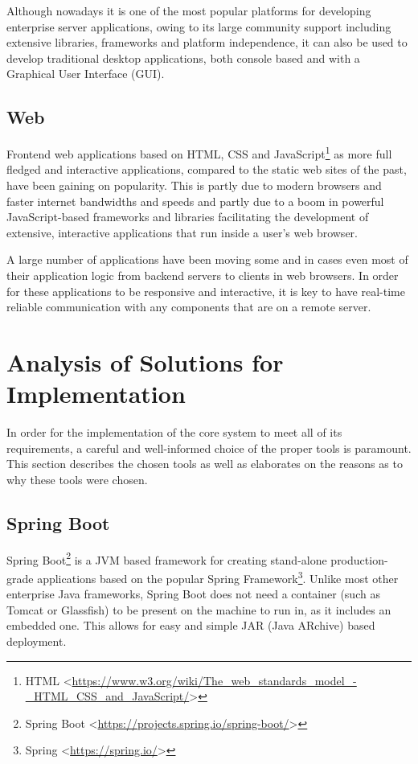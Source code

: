 Although nowadays it is one of the most popular platforms for developing enterprise server applications, owing to its large community support including extensive libraries, frameworks and platform independence, it can also be used to develop traditional desktop applications, both console based and with a Graphical User Interface (GUI).

\subsection{Web}
Frontend web applications based on HTML, CSS and JavaScript\footnote{HTML <\url{https://www.w3.org/wiki/The_web_standards_model_-_HTML_CSS_and_JavaScript/}>} as more full fledged and interactive applications, compared to the static web sites of the past, have been gaining on popularity. This is partly due to modern browsers and faster internet bandwidths and speeds and partly due to a boom in powerful JavaScript-based frameworks and libraries facilitating the development of extensive, interactive applications that run inside a user's web browser.

A large number of applications have been moving some and in cases even most of their application logic from backend servers to clients in web browsers. In order for these applications to be responsive and interactive, it is key to have real-time reliable communication with any components that are on a remote server.

\section{Analysis of Solutions for Implementation}
In order for the implementation of the core system to meet all of its requirements, a careful and well-informed choice of the proper tools is paramount. This section describes the chosen tools as well as elaborates on the reasons as to why these tools were chosen.
\subsection{Spring Boot}
Spring Boot\footnote{Spring Boot <\url{https://projects.spring.io/spring-boot/}>} is a JVM based framework for creating stand-alone production-grade applications based on the popular Spring Framework\footnote{Spring <\url{https://spring.io/}>}. Unlike most other enterprise Java frameworks, Spring Boot does not need a container (such as Tomcat or Glassfish) to be present on the machine to run in, as it includes an embedded one. This allows for easy and simple JAR (Java ARchive) based deployment.

